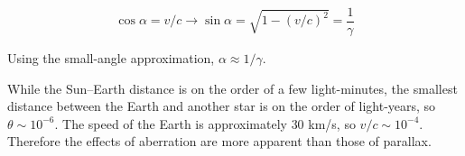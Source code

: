 \documentclass[11pt]{article}
\begin{document}
\begin{pproblem}
\begin{pssolution*}{}{}
\begin{alternativas}
            \[\cos\alpha = v/c \rightarrow \sin\alpha = \sqrt{1-(v/c)^2} = \frac{1}{\gamma}\]

            Using the small-angle approximation, \(\boxed{\alpha \approx 1/\gamma}\).

            \item While the Sun--Earth distance is on the order of a few light-minutes, the smallest distance between the Earth and another star is on the order of light-years, so \(\theta \sim 10^{-6}\). The speed of the Earth is approximately \(30\) km/s, so \(v/c \sim 10^{-4}\). Therefore the effects of aberration are more apparent than those of parallax.


        \end{alternativas}

        \end{pssolution*}

\end{pproblem}
\end{document}
